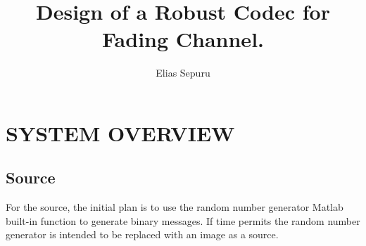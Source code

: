 \documentclass[]{article}
\title{Design of a Robust Codec for Fading Channel.}
\author{Elias Sepuru}
\begin{document}
\maketitle



\section*{SYSTEM OVERVIEW}

\subsection*{Source}
For the source, the initial plan is to use the random number generator Matlab built-in function to generate binary messages. If time permits the random number generator is intended to be replaced with an image as a source.
\end{document}
